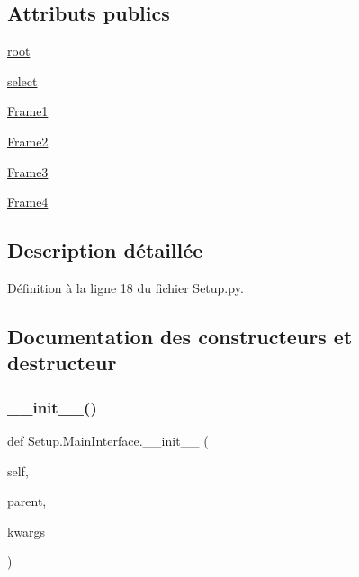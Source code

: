 \subsection*{Attributs publics}
\begin{DoxyCompactItemize}
\item 
\hyperlink{classSetup_1_1MainInterface_a5b5ac00e36d95de14331effa8f720752}{root}
\item 
\hyperlink{classSetup_1_1MainInterface_a55aec7e8acf1047b96ff647558736e35}{select}
\item 
\hyperlink{classSetup_1_1MainInterface_a4e3c881d6cc46af91313eb44b56e726c}{Frame1}
\item 
\hyperlink{classSetup_1_1MainInterface_a5270ea0b93c1e99a752e3a74248d1405}{Frame2}
\item 
\hyperlink{classSetup_1_1MainInterface_a13b6acbd96294fcb53a23ec1d6d3f949}{Frame3}
\item 
\hyperlink{classSetup_1_1MainInterface_a1c2141a149be0a1bfe9603001e76ce01}{Frame4}
\end{DoxyCompactItemize}


\subsection{Description détaillée}


Définition à la ligne 18 du fichier Setup.\+py.



\subsection{Documentation des constructeurs et destructeur}
\mbox{\label{classSetup_1_1MainInterface_af0e5e02f560904a0eccb74c753708bc7}} 
\subsubsection{\texorpdfstring{\+\_\+\+\_\+init\+\_\+\+\_\+()}{\_\_init\_\_()}}
{\footnotesize\ttfamily def Setup.\+Main\+Interface.\+\_\+\+\_\+init\+\_\+\+\_\+ (\begin{DoxyParamCaption}\item[{}]{self,  }\item[{}]{parent,  }\item[{}]{kwargs }\end{DoxyParamCaption})}




